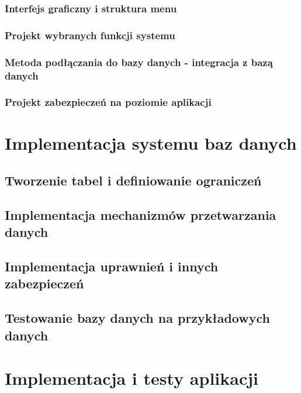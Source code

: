 \documentclass[12pt]{article}
\begin{document}
\subsubsection{Interfejs graficzny i struktura menu}
\subsubsection{Projekt wybranych funkcji systemu}
\subsubsection{Metoda podłączania do bazy danych - integracja z bazą danych}
\subsubsection{Projekt zabezpieczeń na poziomie aplikacji}

\section{Implementacja systemu baz danych}
\subsection{Tworzenie tabel i definiowanie ograniczeń}
\subsection{Implementacja mechanizmów przetwarzania danych}
\subsection{Implementacja uprawnień i innych zabezpieczeń}
\subsection{Testowanie bazy danych na przykładowych danych}


\section{Implementacja i testy aplikacji}
\end{document}
